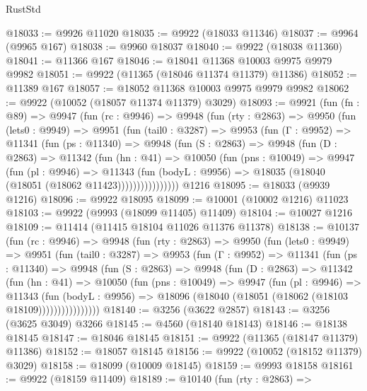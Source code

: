 \begin{lexlean}{RustStd}
\begin{coremodule}
@18033 := @9926 @11020
@18035 := @9922 (@18033 @11346)
@18037 := @9964 (@9965 @167)
@18038 := @9960 @18037
@18040 := @9922 (@18038 @11360)
@18041 := @11366 @167
@18046 := @18041 @11368 @10003 @9975 @9979 @9982
@18051 := @9922 (@11365 (@18046 @11374 @11379) @11386)
@18052 := @11389 @167
@18057 := @18052 @11368 @10003 @9975 @9979 @9982
@18062 := @9922 (@10052 (@18057 @11374 @11379) @3029)
@18093 := @9921
    (fun (fn : @89) =>
    @9947
      (fun (rc : @9946) =>
      @9948
        (fun (rty : @2863) =>
        @9950
          (fun (lets0 : @9949) =>
          @9951
            (fun (tail0 : @3287) =>
            @9953
              (fun (Γ : @9952) =>
              @11341
                (fun (ps : @11340) =>
                @9948
                  (fun (S : @2863) =>
                  @9948
                    (fun (D : @2863) =>
                    @11342
                      (fun (hn : @41) =>
                      @10050
                        (fun (pns : @10049) =>
                        @9947
                          (fun (pl : @9946) =>
                          @11343
                            (fun (bodyL : @9956) =>
                            @18035 (@18040 (@18051 (@18062 @11423))))))))))))))))
    @1216
@18095 := @18033 (@9939 @1216)
@18096 := @9922 @18095
@18099 := @10001 (@10002 @1216) @11023
@18103 := @9922 (@9993 (@18099 @11405) @11409)
@18104 := @10027 @1216
@18109 := @11414 (@11415 @18104 @11026 @11376 @11378)
@18138 := @10137
    (fun (rc : @9946) =>
    @9948
      (fun (rty : @2863) =>
      @9950
        (fun (lets0 : @9949) =>
        @9951
          (fun (tail0 : @3287) =>
          @9953
            (fun (Γ : @9952) =>
            @11341
              (fun (ps : @11340) =>
              @9948
                (fun (S : @2863) =>
                @9948
                  (fun (D : @2863) =>
                  @11342
                    (fun (hn : @41) =>
                    @10050
                      (fun (pns : @10049) =>
                      @9947
                        (fun (pl : @9946) =>
                        @11343
                          (fun (bodyL : @9956) =>
                          @18096 (@18040 (@18051 (@18062 (@18103 @18109))))))))))))))))
@18140 := @3256 (@3622 @2857)
@18143 := @3256 (@3625 @3049) @3266
@18145 := @4560 (@18140 @18143)
@18146 := @18138 @18145
@18147 := @18046 @18145
@18151 := @9922 (@11365 (@18147 @11379) @11386)
@18152 := @18057 @18145
@18156 := @9922 (@10052 (@18152 @11379) @3029)
@18158 := @18099 (@10009 @18145)
@18159 := @9993 @18158
@18161 := @9922 (@18159 @11409)
@18189 := @10140
    (fun (rty : @2863) =>

\end{coremodule}
\end{lexlean}

